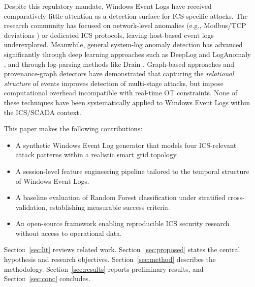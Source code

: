 Despite this regulatory mandate, Windows Event Logs have received comparatively little
attention as a detection surface for ICS-specific attacks. The research community has
focused on network-level anomalies (e.g., Modbus/TCP deviations \cite{goldenberg2013modbus})
or dedicated ICS protocols, leaving host-based event logs underexplored. Meanwhile,
general system-log anomaly detection has advanced significantly through deep learning
approaches such as DeepLog \cite{du2017deeplog} and LogAnomaly \cite{zhao2019loganomaly},
and through log-parsing methods like Drain \cite{he2017drain}. Graph-based approaches
\cite{zhen2025} and provenance-graph detectors \cite{han2020} have demonstrated that
capturing the \emph{relational structure} of events improves detection of multi-stage
attacks, but impose computational overhead incompatible with real-time OT constraints.
None of these techniques have been systematically applied to Windows Event Logs within the
ICS/SCADA context.

This paper makes the following contributions:
\begin{itemize}
  \item A synthetic Windows Event Log generator that models four ICS-relevant attack
        patterns within a realistic smart grid topology.
  \item A session-level feature engineering pipeline tailored to the temporal structure of
        Windows Event Logs.
  \item A baseline evaluation of Random Forest classification under stratified
        cross-validation, establishing measurable success criteria.
  \item An open-source framework enabling reproducible ICS security research without
        access to operational data.
\end{itemize}

Section~\ref{sec:lit} reviews related work. Section~\ref{sec:proposed} states the central
hypothesis and research objectives. Section~\ref{sec:method} describes the methodology.
Section~\ref{sec:results} reports preliminary results, and Section~\ref{sec:conc} concludes.
